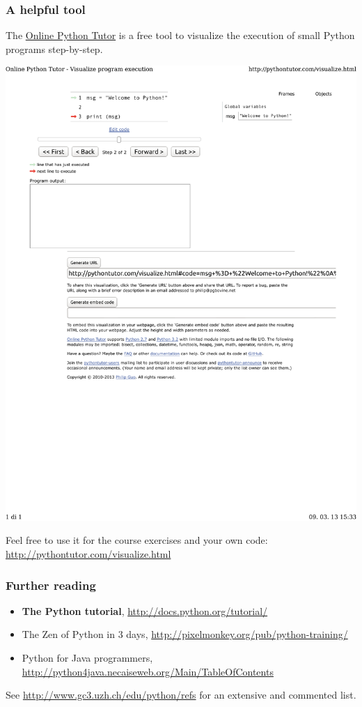 \documentclass[english,serif,mathserif,xcolor=pdftex,dvipsnames,table]{beamer}
\begin{document}
\begin{frame}
  \frametitle{A helpful tool}

  The \href{http://pythontutor.com}{Online Python Tutor} is a free
  tool to visualize the execution of small Python programs
  step-by-step.

  \+
  \href{http://tinyurl.com/cf5ftwr}{%
    \centering
    \includegraphics[width=1.0\linewidth,viewport=0 600 500 750,clip]{fig/pythontutor}
  }

  \+ Feel free to use it for the course exercises and your own code:
  \url{http://pythontutor.com/visualize.html}
\end{frame}

\begin{frame}
  \frametitle{Further reading}

  \begin{itemize}
    \item \textbf{The Python tutorial},
      {\small \url{http://docs.python.org/tutorial/}}
    \item {The Zen of Python in 3 days},
      {\small \url{http://pixelmonkey.org/pub/python-training/}}
    \item {Python for Java programmers},
      {\small \url{http://python4java.necaiseweb.org/Main/TableOfContents}}
  \end{itemize}

  \+
  See {\small\url{http://www.gc3.uzh.ch/edu/python/refs}}
  for an extensive and commented list.

\end{frame}
\end{document}
